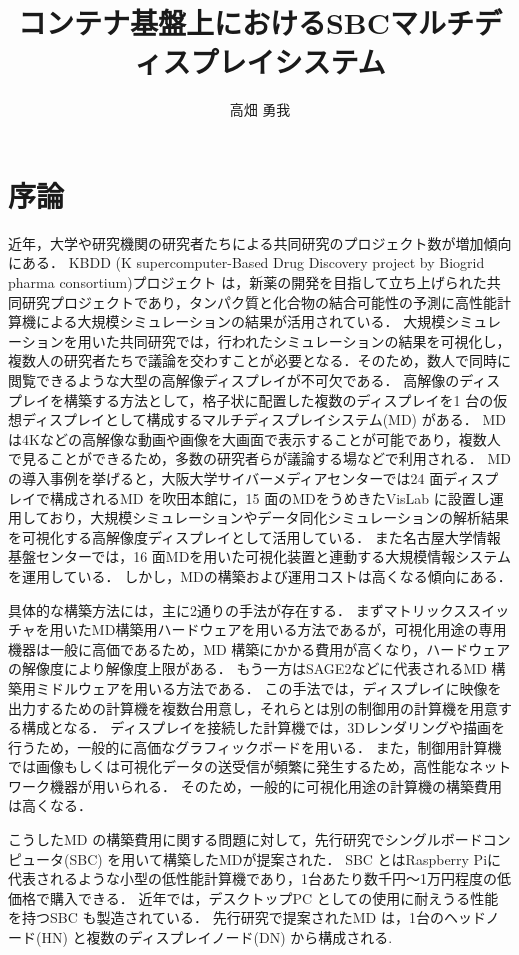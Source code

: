 \documentclass[12pt,a4paper]{jbook}
\title{コンテナ基盤上におけるSBCマルチディスプレイシステム}
\author{高畑 勇我}
\begin{document}
\coverpage

\tableofcontents

\body

\chapter{序論}
近年，大学や研究機関の研究者たちによる共同研究のプロジェクト数が増加傾向にある．
KBDD (K supercomputer-Based Drug Discovery project by Biogrid pharma consortium)プロジェクト は，新薬の開発を目指して立ち上げられた共同研究プロジェクトであり，タンパク質と化合物の結合可能性の予測に高性能計算機による大規模シミュレーションの結果が活用されている．
大規模シミュレーションを用いた共同研究では，行われたシミュレーションの結果を可視化し，複数人の研究者たちで議論を交わすことが必要となる．そのため，数人で同時に閲覧できるような大型の高解像ディスプレイが不可欠である．
高解像のディスプレイを構築する方法として，格子状に配置した複数のディスプレイを1 台の仮想ディスプレイとして構成するマルチディスプレイシステム(MD) がある．
MD は4Kなどの高解像な動画や画像を大画面で表示することが可能であり，複数人で見ることができるため，多数の研究者らが議論する場などで利用される．
MDの導入事例を挙げると，大阪大学サイバーメディアセンターでは24 面ディスプレイで構成されるMD を吹田本館に，15 面のMDをうめきたVisLab に設置し運用しており，大規模シミュレーションやデータ同化シミュレーションの解析結果を可視化する高解像度ディスプレイとして活用している\cite{ciber_media}．
また名古屋大学情報基盤センターでは，16 面MDを用いた可視化装置と連動する大規模情報システムを運用している．
しかし，MDの構築および運用コストは高くなる傾向にある．

具体的な構築方法には，主に2通りの手法が存在する．
まずマトリックススイッチャを用いたMD構築用ハードウェアを用いる方法であるが，可視化用途の専用機器は一般に高価であるため，MD 構築にかかる費用が高くなり，ハードウェアの解像度により解像度上限がある．
もう一方はSAGE2などに代表されるMD 構築用ミドルウェアを用いる方法である．
この手法では，ディスプレイに映像を出力するための計算機を複数台用意し，それらとは別の制御用の計算機を用意する構成となる．
ディスプレイを接続した計算機では，3Dレンダリングや描画を行うため，一般的に高価なグラフィックボードを用いる．
また，制御用計算機では画像もしくは可視化データの送受信が頻繁に発生するため，高性能なネットワーク機器が用いられる．
そのため，一般的に可視化用途の計算機の構築費用は高くなる．

こうしたMD の構築費用に関する問題に対して，先行研究でシングルボードコンピュータ(SBC) を用いて構築したMDが提案された．
SBC とはRaspberry Piに代表されるような小型の低性能計算機であり，1台あたり数千円～1万円程度の低価格で購入できる．
近年では，デスクトップPC としての使用に耐えうる性能を持つSBC も製造されている．
先行研究で提案されたMD は，1台のヘッドノード(HN) と複数のディスプレイノード(DN) から構成される.
\end{document}
